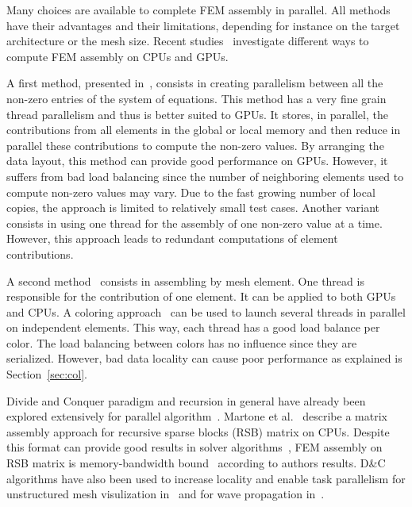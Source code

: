 \documentclass[10pt]{IOS-Book-Article}
\begin{document}
Many choices are available to complete FEM assembly in parallel.
All methods have their advantages and their limitations, depending for instance on the target architecture or the mesh size.
Recent studies~\cite{cecka2011assembly,CPUGPUasm} investigate different ways to compute FEM assembly on CPUs and GPUs.

A first method, presented in~\cite{cecka2011assembly}, consists in creating parallelism between all the non-zero entries of the system of equations.
This method has a very fine grain thread parallelism and thus is better suited to GPUs.
It stores, in parallel, the contributions from all elements in the global or local memory and then reduce in parallel these contributions to compute the non-zero values. By arranging the data layout, this method can provide good performance on GPUs.
However, it suffers from bad load balancing since the number of neighboring elements used to compute non-zero values may vary.
Due to the fast growing number of local copies, the approach is limited to relatively small test cases.
Another variant consists in using one thread for the assembly of one non-zero value at a time.
However, this approach leads to redundant computations of element contributions.

A second method~\cite{cecka2011assembly} consists in assembling by mesh element.
One thread is responsible for the contribution of one element.
It can be applied to both GPUs and CPUs.
A coloring approach~\cite{CPUfe} can be used to launch several threads in parallel on independent elements.
This way, each thread has a good load balance per color.
The load balancing between colors has no influence since they are serialized.
However, bad data locality can cause poor performance as explained is Section~\ref{sec:col}.

Divide and Conquer paradigm and recursion in general have already been explored extensively for parallel algorithm~\cite{div}.
Martone et al.~\cite{RSBasm} describe a matrix assembly approach for recursive sparse blocks (RSB) matrix on CPUs.
Despite this format can provide good results in solver algorithms~\cite{RSBsolver}, FEM assembly on RSB matrix is memory-bandwidth bound~\cite{RSBasm} according to authors results.
D\&C algorithms have also been used to increase locality and enable task parallelism for unstructured mesh
visulization in~\cite{tvcg10,egpgv10,hppc10} and for wave propagation in~\cite{dc_specfem}.
\end{document}
